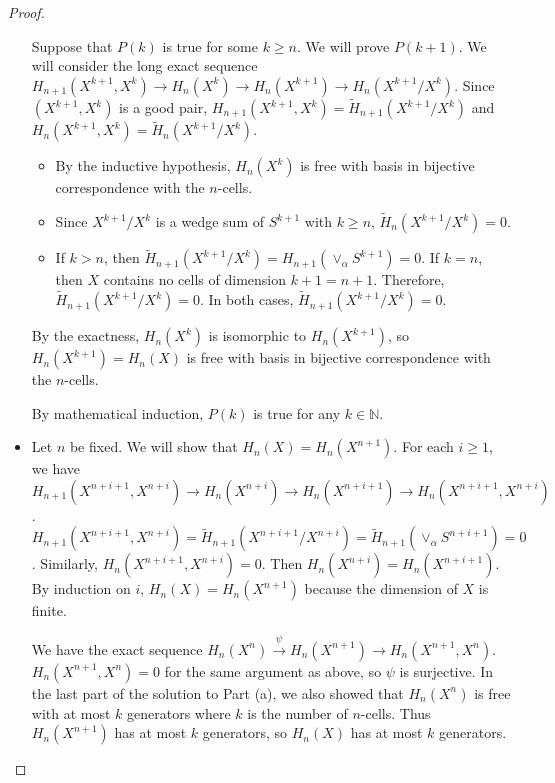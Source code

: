 \documentclass[12pt, psamsfonts]{amsart}
\theoremstyle{definition}
\theoremstyle{remark}
\numberwithin{equation}{section}
\begin{document}
\begin{proof}
\begin{itemize}
      Suppose that $P(k)$ is true for some $k \geq n$.
      We will prove $P(k + 1)$.
      We will consider the long exact sequence $H_{n + 1}(X^{k + 1}, X^k) \rightarrow H_n(X^k) \rightarrow H_n(X^{k + 1}) \rightarrow H_n(X^{k + 1} / X^k)$.
      Since $(X^{k + 1}, X^k)$ is a good pair, $H_{n + 1}(X^{k + 1}, X^k) = \tilde{H}_{n + 1}(X^{k + 1} / X^k)$ and $H_{n}(X^{k + 1}, X^k) = \tilde{H}_{n}(X^{k + 1} / X^k)$.
      \begin{itemize}
        \item
          By the inductive hypothesis, $H_n(X^k)$ is free with basis in bijective correspondence with the $n$-cells.
        \item
          Since $X^{k + 1} / X^k$ is a wedge sum of $S^{k + 1}$ with $k \geq n$, $\tilde{H}_n(X^{k + 1} / X^k) = 0$.
        \item
          If $k > n$, then $\tilde{H}_{n + 1}(X^{k + 1} / X^k) = H_{n + 1}(\vee_{\alpha} S^{k + 1}) = 0$.
          If $k = n$, then $X$ contains no cells of dimension $k + 1 = n + 1$.
          Therefore, $\tilde{H}_{n + 1}(X^{k + 1} / X^k) = 0$.
          In both cases, $\tilde{H}_{n + 1}(X^{k + 1} / X^k) = 0$.
      \end{itemize}
      By the exactness, $H_n(X^k)$ is isomorphic to $H_n(X^{k + 1})$, so $H_n(X^{k + 1}) = H_n(X)$ is free with basis in bijective correspondence with the $n$-cells.

      By mathematical induction, $P(k)$ is true for any $k \in \mathbb{N}$.
    \item
      Let $n$ be fixed.
      We will show that $H_n(X) = H_n(X^{n + 1})$.
      For each $i \geq 1$, we have $H_{n + 1}(X^{n + i + 1}, X^{n + i}) \rightarrow H_{n}(X^{n + i}) \rightarrow H_{n}(X^{n + i + 1}) \rightarrow H_n(X^{n + i + 1}, X^{n + i})$.
      $H_{n + 1}(X^{n + i + 1}, X^{n + i}) = \tilde{H}_{n + 1}(X^{n + i + 1} / X^{n + i}) = \tilde{H}_{n + 1}(\vee_{\alpha} S^{n + i + 1}) = 0$.
      Similarly, $H_n(X^{n + i + 1}, X^{n + i}) = 0$.
      Then $H_{n}(X^{n + i}) = H_n(X^{n + i + 1})$.
      By induction on $i$, $H_n(X) = H_n(X^{n + 1})$ because the dimension of $X$ is finite.

      We have the exact sequence $H_n(X^n) \xrightarrow{\psi} H_n(X^{n + 1}) \rightarrow H_n(X^{n + 1}, X^n)$.
      $H_n(X^{n + 1}, X^n) = 0$ for the same argument as above, so $\psi$ is surjective.
      In the last part of the solution to Part (a), we also showed that $H_n(X^n)$ is free with at most $k$ generators where $k$ is the number of $n$-cells.
      Thus $H_n(X^{n + 1})$ has at most $k$ generators, so $H_n(X)$ has at most $k$ generators.
  \end{itemize}
\end{proof}
\end{document}
